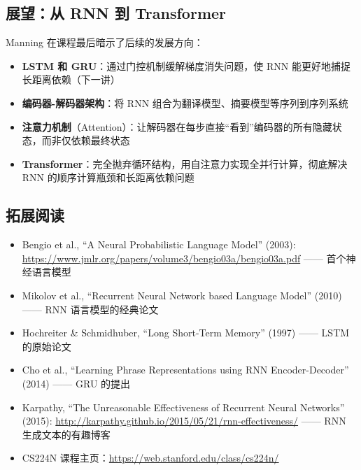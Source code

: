\subsection{展望：从 RNN 到 Transformer}

Manning 在课程最后暗示了后续的发展方向：

\begin{itemize}
    \item \textbf{LSTM 和 GRU}：通过门控机制缓解梯度消失问题，使 RNN 能更好地捕捉长距离依赖（下一讲）
    \item \textbf{编码器-解码器架构}：将 RNN 组合为翻译模型、摘要模型等序列到序列系统
    \item \textbf{注意力机制}（Attention）：让解码器在每步直接``看到''编码器的所有隐藏状态，而非仅依赖最终状态
    \item \textbf{Transformer}：完全抛弃循环结构，用自注意力实现全并行计算，彻底解决 RNN 的顺序计算瓶颈和长距离依赖问题
\end{itemize}

\subsection{拓展阅读}

\begin{itemize}
    \item Bengio et al., ``A Neural Probabilistic Language Model'' (2003): \url{https://www.jmlr.org/papers/volume3/bengio03a/bengio03a.pdf} —— 首个神经语言模型
    \item Mikolov et al., ``Recurrent Neural Network based Language Model'' (2010) —— RNN 语言模型的经典论文
    \item Hochreiter \& Schmidhuber, ``Long Short-Term Memory'' (1997) —— LSTM 的原始论文
    \item Cho et al., ``Learning Phrase Representations using RNN Encoder-Decoder'' (2014) —— GRU 的提出
    \item Karpathy, ``The Unreasonable Effectiveness of Recurrent Neural Networks'' (2015): \url{http://karpathy.github.io/2015/05/21/rnn-effectiveness/} —— RNN 生成文本的有趣博客
    \item CS224N 课程主页：\url{https://web.stanford.edu/class/cs224n/}
\end{itemize}


